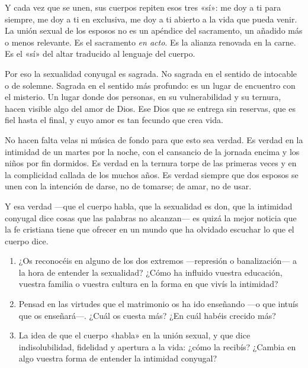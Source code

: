 Y cada vez que se unen, sus cuerpos repiten esos tres «sí»: me doy a ti para siempre, me doy a ti en exclusiva, me doy a ti abierto a la vida que pueda venir. La unión sexual de los esposos no es un apéndice del sacramento, un añadido más o menos relevante. Es el sacramento \emph{en acto}. Es la alianza renovada en la carne. Es el «sí» del altar traducido al lenguaje del cuerpo.

Por eso la sexualidad conyugal es sagrada. No sagrada en el sentido de intocable o de solemne. Sagrada en el sentido más profundo: es un lugar de encuentro con el misterio. Un lugar donde dos personas, en su vulnerabilidad y su ternura, hacen visible algo del amor de Dios. Ese Dios que se entrega sin reservas, que es fiel hasta el final, y cuyo amor es tan fecundo que crea vida.

No hacen falta velas ni música de fondo para que esto sea verdad. Es verdad en la intimidad de un martes por la noche, con el cansancio de la jornada encima y los niños por fin dormidos. Es verdad en la ternura torpe de las primeras veces y en la complicidad callada de los muchos años. Es verdad siempre que dos esposos se unen con la intención de darse, no de tomarse; de amar, no de usar.

Y esa verdad ---que el cuerpo habla, que la sexualidad es don, que la intimidad conyugal dice cosas que las palabras no alcanzan--- es quizá la mejor noticia que la fe cristiana tiene que ofrecer en un mundo que ha olvidado escuchar lo que el cuerpo dice.

\paracaminar

\begin{enumerate}
  \item ¿Os reconocéis en alguno de los dos extremos ---represión o banalización--- a la hora de entender la sexualidad? ¿Cómo ha influido vuestra educación, vuestra familia o vuestra cultura en la forma en que vivís la intimidad?

  \item Pensad en las virtudes que el matrimonio os ha ido enseñando ---o que intuís que os enseñará---. ¿Cuál os cuesta más? ¿En cuál habéis crecido más?

  \item La idea de que el cuerpo «habla» en la unión sexual, y que dice indisolubilidad, fidelidad y apertura a la vida: ¿cómo la recibís? ¿Cambia en algo vuestra forma de entender la intimidad conyugal?
\end{enumerate}

